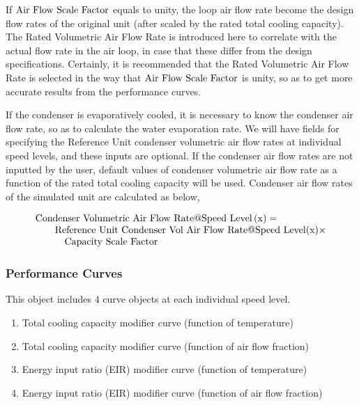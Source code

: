 If \({\rm{Air~Flow~Scale~Factor}}\) equals to unity, the loop air flow rate become the design flow rates of the original unit (after scaled by the rated total cooling capacity). The Rated Volumetric Air Flow Rate is introduced here to correlate with the actual flow rate in the air loop, in case that these differ from the design specifications. Certainly, it is recommended that the Rated Volumetric Air Flow Rate is selected in the way that \({\rm{Air~Flow~Scale~Factor}}\) is unity, so as to get more accurate results from the performance curves.

If the condenser is evaporatively cooled, it is necessary to know the condenser air flow rate, so as to calculate the water evaporation rate. We will have fields for specifying the Reference Unit condenser volumetric air flow rates at individual speed levels, and these inputs are optional. If the condenser air flow rates are not inputted by the user, default values of condenser volumetric air flow rate as a function of the rated total cooling capacity will be used. Condenser air flow rates of the simulated unit are calculated as below,

\begin{equation}
  \begin{array}{l}
    \rm{Condenser~Volumetric~Air~Flow~Rate} @ \rm{Speed~Level} \left( {\rm{x}} \right) = \\
    \quad \quad \rm{Reference~Unit~Condenser~Vol~Air~Flow~Rate} @ \rm{Speed~Level} (\rm{x}) \times \\
    \quad \quad \quad \rm{Capacity~Scale~Factor}
  \end{array}
\end{equation}

\subsubsection{Performance Curves}\label{performance-curves}

This object includes 4 curve objects at each individual speed level.

\begin{enumerate}
\def\labelenumi{\arabic{enumi})}
\tightlist
\item Total cooling capacity modifier curve (function of temperature)
\item Total cooling capacity modifier curve (function of air flow fraction)
\item Energy input ratio (EIR) modifier curve (function of temperature)
\item Energy input ratio (EIR) modifier curve (function of air flow fraction)
\end{enumerate}

